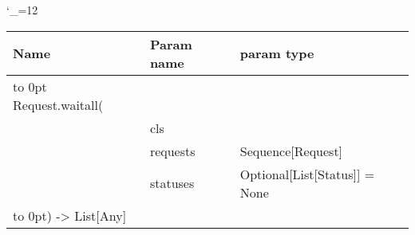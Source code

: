 \begingroup \catcode`\_=12 \tt
\begin{tabular}{lll}
\toprule
\textrm{Name}&\textrm{Param name}&\textrm{param type}\\
\midrule
\hbox to 0pt {Request.waitall(\hss}\\
& cls\\
& requests & Sequence[Request]\\
& statuses & Optional[List[Status]] = None\\
\hbox to 0pt{) -> List[Any]\hss}\\
\bottomrule
\end{tabular}
\endgroup
